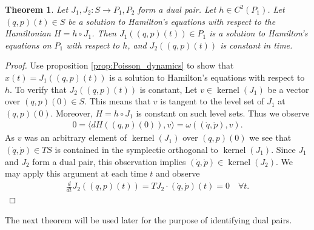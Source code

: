 \documentclass[12pt]{amsart}
\newtheorem{thm}{Theorem}[section]
\DeclareMathOperator{\kernel}{kernel}
\begin{document}
  \begin{thm} \label{thm:dual_pairs}
    Let $J_1,J_2:S \to P_1,P_2$ form a dual pair.
    Let $h \in C^2(P_1)$.
    Let $(q,p)(t) \in S$ be a solution to Hamilton's equations
    with respect to the Hamiltonian $H = h \circ J_1$.
    Then $J_1\left( (q,p)(t) \right) \in P_1$ is a solution
    to Hamilton's equations on $P_1$ with respect to $h$,
    and $J_2( (q,p)(t))$ is constant in time.
  \end{thm}
  \begin{proof}
    Use proposition \ref{prop:Poisson_dynamics} to show that
    $x(t) = J_1 ((q,p)(t))$ is a solution to Hamilton's equations
    with respect to $h$.
    To verify that $J_2( (q,p)(t) )$ is constant,
    Let $v \in \kernel(J_1)$ be a vector over $(q,p)(0) \in S$.
    This means that $v$ is tangent to the level set of $J_1$ at $(q,p)(0)$.
    Moreover, $H = h \circ J_1$ is constant on such level sets.
    Thus we observe
    \begin{align*}
      0 = \langle dH((q,p)(0)) , v \rangle =
      \omega \left( (\dot{q},\dot{p}) , v \right).
    \end{align*}
    As $v$ was an arbitrary element of $\kernel(J_1)$ over $(q,p)(0)$
    we see that $(\dot{q},\dot{p}) \in TS$ is contained
    in the symplectic orthogonal to $\kernel(J_1)$.
    Since $J_1$ and $J_2$ form a dual pair,
    this observation implies $(\dot{q},\dot{p}) \in \kernel(J_2)$.
    We may apply this argument at each time $t$ and observe
    \begin{align*}
      \frac{d}{dt} J_2( (q,p)(t)) = TJ_2 \cdot (\dot{q},\dot{p})(t)  
      = 0 \quad \forall t.
    \end{align*}
  \end{proof}
  
  The next theorem will be used later for the purpose of identifying
  dual pairs.
  
\end{document}
